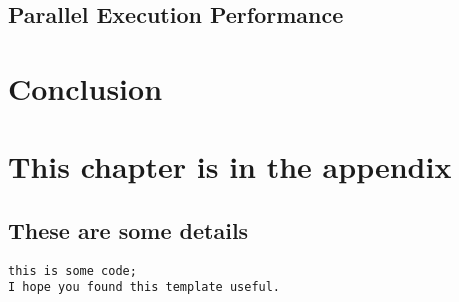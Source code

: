 \documentclass[12pt, a4paper]{report}
\theoremstyle{definition}
\theoremstyle{definition}%
\theoremstyle{definition}%
\theoremstyle{definition}%
\theoremstyle{definition}%
\theoremstyle{definition}%
\begin{document}
\section{Parallel Execution Performance}
\chapter{Conclusion}

\appendix

\chapter{This chapter is in the appendix}
\section{These are some details}
\begin{lstlisting}
this is some code;
I hope you found this template useful.
\end{lstlisting}


\bibliomatter





 
\end{document}
